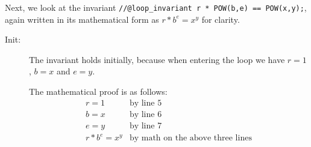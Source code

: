 \noindent
Next, we look at the invariant %
\lstinline'//@loop_invariant r * POW(b,e) == POW(x,y);', %
again written in its mathematical form as $r * b^e = x^y$
for clarity.
\begin{description}
\item[Init:] The invariant holds initially, because when entering the
  loop we have $r = 1$, $b = x$ and $e = y$.

  The mathematical proof is as follows:
  $$
  \begin{array}{ll}
     r = 1         & \text{by line 5}
  \\ b = x         & \text{by line 6}
  \\ e = y         & \text{by line 7}
  \\ r * b^e = x^y & \text{by math on the above three lines}
  \end{array}
  $$


\end{description}
